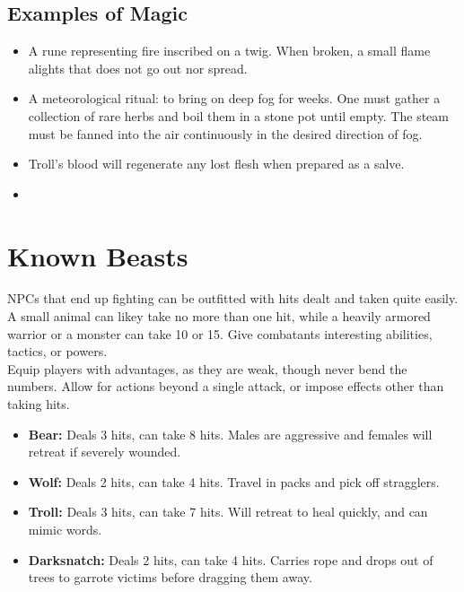 \documentclass[a4paper]{article}
\begin{document}
\begin{multicols}{2}
\subsection{Examples of Magic}

\begin{itemize}
\item A rune representing fire inscribed on a twig. When broken, a small flame alights that does not go out nor spread.
\item A meteorological ritual: to bring on deep fog for weeks. One must gather a collection of rare herbs and boil them in a stone pot until empty. The steam must be fanned into the air continuously in the desired direction of fog. 
\item Troll's blood will regenerate any lost flesh when prepared as a salve.
\item 
\end{itemize}

\section{Known Beasts}

NPCs that end up fighting can be outfitted with hits dealt and taken quite easily.
A small animal can likey take no more than one hit, while a heavily armored warrior or a monster can take 10 or 15. Give combatants interesting abilities, tactics, or powers. \\

Equip players with advantages, as they are weak, though never bend the numbers.
Allow for actions beyond a single attack, or impose effects other than taking hits. \\

\begin{itemize}
\item \textbf{Bear:} Deals 3 hits, can take 8 hits. Males are aggressive and females will retreat if severely wounded.
\item \textbf{Wolf: } Deals 2 hits, can take 4 hits. Travel in packs and pick off stragglers.
\item \textbf{Troll: } Deals 3 hits, can take 7 hits. Will retreat to heal quickly, and can mimic words.
\item \textbf{Darksnatch: } Deals 2 hits, can take 4 hits. Carries rope and drops out of trees to garrote victims before dragging them away. 
\end{itemize}



\end{multicols}
\end{document}
